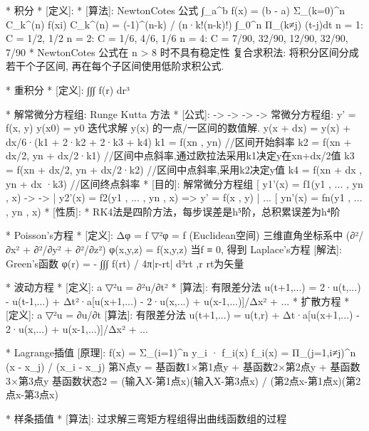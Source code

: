 \documentclass{article}
\begin{document}
    *                    积分
    *	[定义]:
    *	[算法]: NewtonCotes 公式
            ∫_a^b f(x) = (b - a) Σ_(k=0)^n  C_k^(n) f(xi)
            C_k^(n) = (-1)^(n-k) / (n·k!(n-k)!) ∫_0^n Π_(k≠j) (t-j)dt 
            n = 1: C = {1/2, 1/2}
            n = 2: C = {1/6, 4/6, 1/6}
            n = 4: C = {7/90, 32/90, 12/90, 32/90, 7/90}
            * NewtonCotes 公式在 n > 8 时不具有稳定性
            复合求积法: 将积分区间分成若干个子区间, 再在每个子区间使用低阶求积公式.


*                    重积分
*	[定义]: ∫∫∫ f(r) dr³


*                    解常微分方程组: Runge Kutta 方法
*	[公式]:           ->   ->       ->      ->
		常微分方程组: y' = f(x, y)	y(x0) = y0
		迭代求解 \vec y(x) 的一点/一区间的数值解.
		y(x + dx) = y(x) + dx/6·(k1 + 2·k2 + 2·k3 + k4)
		k1 = f(xn , yn)						//区间开始斜率
		k2 = f(xn + dx/2, yn + dx/2·k1)	//区间中点斜率,通过欧拉法采用k1决定y在xn+dx/2值
		k3 = f(xn + dx/2, yn + dx/2·k2)	//区间中点斜率,采用k2决定y值
		k4 = f(xn + dx	, yn + dx  ·k3)	//区间终点斜率
*	[目的]: 解常微分方程组
		[ y1'(x) = f1(y1 , ... , yn , x)          ->   ->
		| y2'(x) = f2(y1 , ... , yn , x)    =>    y' = f(x , y)
		| ...
		[ yn'(x) = fn(y1 , ... , yn , x)
*	[性质]:
		* RK4法是四阶方法，每步误差是h⁵阶，总积累误差为h⁴阶


*                    Poisson's方程
*	[定义]: Δφ = f
			▽²φ = f  (Euclidean空间)
		三维直角坐标系中 (∂²/∂x² + ∂²/∂y² + ∂²/∂z²) φ(x,y,z) = f(x,y,z)
		当f ≡ 0, 得到 Laplace's方程
	[解法]:  Green's函数  φ(r) = - ∫∫∫ f(rt) / 4π|r-rt| d³rt    ,r rt为矢量


*                    波动方程
*	[定义]: a ▽²u = ∂²u/∂t²
*	[算法]: 有限差分法
		u(t+1,...) = 2·u(t,...) - u(t-1,...)
				+ Δt²·a{[u(x+1,...) - 2·u(x,...) + u(x-1,...)]/Δx² + ...}
*                    扩散方程
*	[定义]: a ▽²u = ∂u/∂t
	[算法]: 有限差分法
		u(t+1,...) = u(t,r)
				+ Δt·a{[u(x+1,...) - 2·u(x,...) + u(x-1,...)]/Δx² + ...}



*					Lagrange插值
	[原理]:
		f(x) = Σ_(i=1)^n  y_i · f_i(x)
		f_i(x) = Π_(j=1,i≠j)^n  (x - x_j) / (x_i - x_j)
		第N点y = 基函数1×第1点y + 基函数2×第2点y + 基函数3×第3点y
		基函数状态2 = (输入X-第1点x)(输入X-第3点x) / (第2点x-第1点x)(第2点x-第3点x)


*					样条插值
*	[算法]: 过求解三弯矩方程组得出曲线函数组的过程
\end{document}
